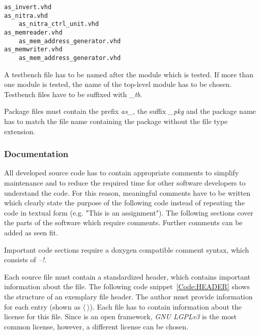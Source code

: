 \begin{lstlisting}[style=hdl, label=Code:FILE_NAMES, caption=\asterics module file names]
as_invert.vhd
as_nitra.vhd
	as_nitra_ctrl_unit.vhd
as_memreader.vhd
	as_mem_address_generator.vhd
as_memwriter.vhd
	as_mem_address_generator.vhd
\end{lstlisting}

A testbench file has to be named after the module which is tested. If more than one module is tested, the name of the top-level module has to be chosen. Testbench files have to be suffixed with \textit{\_tb}.

Package files must contain the prefix \textit{as\_}, the suffix \textit{\_pkg} and the package name has to match the file name containing the package without the file type extension. 


\subsubsection{Documentation}\label{VHDL-Documentation}
All developed source code has to contain appropriate comments to simplify maintenance and to reduce the required time for other software developers to understand the code.
For this reason, meaningful comments have to be written which clearly state the purpose of the following code instead of repeating the code in textual form (e.g. "This is an assignment").
The following sections cover the parts of the software which require comments.
Further comments can be added as seen fit.

Important code sections require a doxygen compatible comment syntax, which consists of \textit{--!}. 

Each source file must contain a standardized header, which contains important information about the file.
The following code snippet~\ref{Code:HEADER} shows the structure of an exemplary file header.
The author must provide information for each entry (shown as $\langle\ \rangle$).
Each file has to contain information about the license for this file.
Since \asterics is an open framework, \textit{GNU LGPLv3} is the most common license, however, a different license can be chosen.

